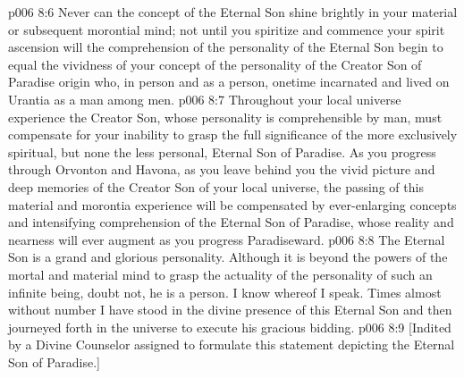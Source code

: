 \vs p006 8:6 Never can the concept of the Eternal Son shine brightly in your material or subsequent morontial mind; not until you spiritize and commence your spirit ascension will the comprehension of the personality of the Eternal Son begin to equal the vividness of your concept of the personality of the Creator Son of Paradise origin who, in person and as a person, onetime incarnated and lived on Urantia as a man among men.
\vs p006 8:7 Throughout your local universe experience the Creator Son, whose personality is comprehensible by man, must compensate for your inability to grasp the full significance of the more exclusively spiritual, but none the less personal, Eternal Son of Paradise. As you progress through Orvonton and Havona, as you leave behind you the vivid picture and deep memories of the Creator Son of your local universe, the passing of this material and morontia experience will be compensated by ever\hyp{}enlarging concepts and intensifying comprehension of the Eternal Son of Paradise, whose reality and nearness will ever augment as you progress Paradiseward.
\pc \vs p006 8:8 The Eternal Son is a grand and glorious personality. Although it is beyond the powers of the mortal and material mind to grasp the actuality of the personality of such an infinite being, doubt not, he is a person. I know whereof I speak. Times almost without number I have stood in the divine presence of this Eternal Son and then journeyed forth in the universe to execute his gracious bidding.
\vsetoff
\vs p006 8:9 [Indited by a Divine Counselor assigned to formulate this statement depicting the Eternal Son of Paradise.]
